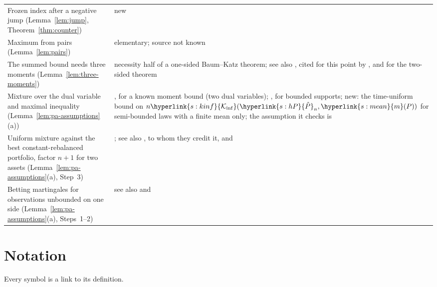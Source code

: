 \documentclass[11pt]{article}
\newcommand{\sy}[2]{{\hyperlink{#1}{#2}}}
\newcommand{\mean}{\sy{s:mean}{m}}
\newcommand{\Kinf}{\sy{s:kinf}{\mathcal{K}_{\inf}}}
\newcommand{\hP}{\sy{s:hP}{\hat{P}}}
\begin{document}
\begin{center}
\begin{tabular}{@{}p{}p{}@{}}
Frozen index after a negative jump (Lemma~\ref{lem:jump}, Theorem~\ref{thm:counter}) & new \\
Maximum from pairs (Lemma~\ref{lem:pairs}) & elementary; source not known \\
The summed bound needs three moments (Lemma~\ref{lem:three-moments}) & necessity half of a one-sided Baum--Katz theorem; see also \citet{CL75}, cited for this point by \citet[Section~9]{HT15}, and \citet{BK65} for the two-sided theorem \\
Mixture over the dual variable and maximal inequality (Lemma~\ref{lem:pa-assumptions}(a)) & \citet[Proposition~5, Appendix~B.4.1]{AJK21}, for a known moment bound (two dual variables); \citet[Appendix~A.1]{PA26}, for bounded supports; new: the time-uniform bound on $n\Kinf(\hP_n,\mean(P))$ for semi-bounded laws with a finite mean only; the assumption it checks is \citet[Assumption~2.3]{PA26} \\
Uniform mixture against the best constant-rebalanced portfolio, factor $n+1$ for two assets (Lemma~\ref{lem:pa-assumptions}(a), Step~3) & \citet[Theorem~1]{BK99}; see also \citet{CO96}, to whom they credit it, and \citet{Cov91} \\
Betting martingales for observations unbounded on one side (Lemma~\ref{lem:pa-assumptions}(a), Steps~1--2) & see also \citet[Proposition~3 in arXiv v7]{WSR24} and \citet[Section~2]{Min22} \\
\bottomrule
\end{tabular}
\end{center}


\section{Notation}\label{sec:notation}

Every symbol is a link to its definition.
\end{document}
